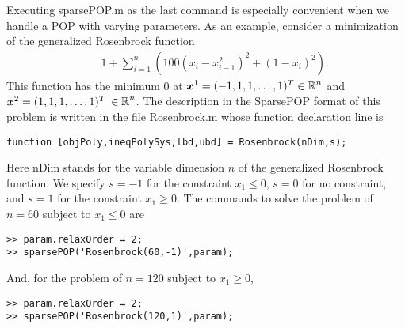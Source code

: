 Executing sparsePOP.m as the last command is especially convenient when we handle a POP 
with varying 
parameters. As an example, consider a minimization of the generalized Rosenbrock 
function 
\begin{eqnarray*}
& & 1+ \sum_{i=1}^n \left(100(x_i-x_{i-1}^2)^2 + (1-x_i)^2 \right). 
\end{eqnarray*}
This function has the minimum $0$ at $\x^1 = (-1,1,1,\ldots,1)^T \in \Real^n$  and 
$\x^2 = (1,1,1,\ldots,1)^T$ $ \in \Real^n$. 
The description in the SparsePOP format  of this problem 
is written in the file Rosenbrock.m whose function declaration line is 
\begin{verbatim}
function [objPoly,ineqPolySys,lbd,ubd] = Rosenbrock(nDim,s);
\end{verbatim}
Here {\sf nDim} stands for the variable dimension $n$ of the generalized Rosenbrock function. 
We specify $s=-1$ for the constraint $x_1 \leq 0$, $s=0$ for no constraint, and 
$s=1$ for the constraint $x_1 \geq 0$. The commands to solve
the problem of $n=60$ subject to $x_1 \leq 0$ are
\begin{verbatim}
>> param.relaxOrder = 2;
>> sparsePOP('Rosenbrock(60,-1)',param);
\end{verbatim}
And, for the problem of $n=120$ subject to $x_1 \geq 0$,  
\begin{verbatim}
>> param.relaxOrder = 2;
>> sparsePOP('Rosenbrock(120,1)',param);
\end{verbatim}

